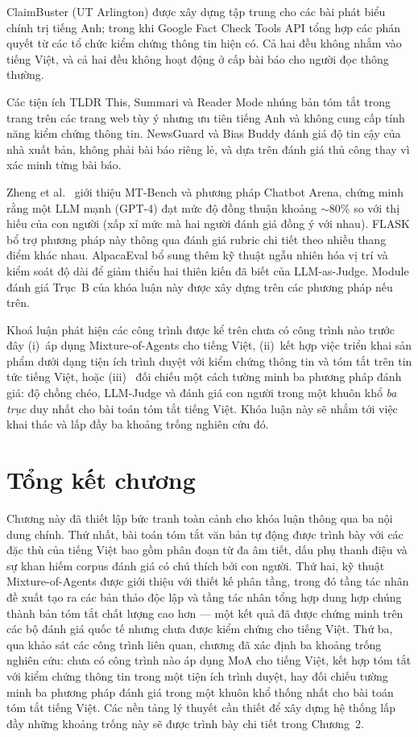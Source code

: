 ClaimBuster (UT Arlington) được xây dựng tập trung cho các bài 
phát biểu chính trị tiếng Anh; trong khi Google Fact
Check Tools API tổng hợp các phán quyết từ các tổ chức kiểm chứng
thông tin hiện có. Cả hai đều không nhắm vào tiếng Việt, và cả hai
đều không hoạt động ở cấp bài báo cho người đọc thông thường.

Các tiện ích TLDR This, Summari và
Reader Mode nhúng bản tóm tắt trong trang trên các trang web
tùy ý nhưng ưu tiên tiếng Anh và không cung cấp tính năng kiểm chứng thông
tin. NewsGuard và Bias Buddy đánh giá độ tin cậy
của nhà xuất bản, không phải bài báo riêng lẻ, và dựa trên
đánh giá thủ công thay vì xác minh từng bài báo.

Zheng et al.\ \cite{Zheng2023} giới thiệu MT-Bench và phương pháp
Chatbot Arena, chứng minh rằng một LLM mạnh (GPT-4) đạt mức độ đồng thuận
khoảng $\sim$80\% so với thị hiếu của con người (xấp xỉ
mức mà hai người đánh giá đồng ý với nhau). FLASK \cite{Ye2023} bổ trợ phương pháp này thông qua đánh giá rubric chi tiết theo nhiều thang điểm khác nhau. AlpacaEval \cite{Dubois2024} bổ sung thêm kỹ thuật ngẫu nhiên hóa vị trí
và kiểm soát độ dài để giảm thiểu hai thiên kiến đã biết của LLM-as-Judge. Module đánh giá Trục~B của khóa luận này được xây dựng trên các
phương pháp nếu trên.

Khoá luận phát hiện các công trình được kể trên chưa có công trình nào trước đây (i)~áp dụng
Mixture-of-Agents cho tiếng Việt, (ii)~kết hợp việc triển khai sản phẩm dưới dạng tiện ích trình duyệt với kiểm chứng thông tin và tóm tắt trên tin tức
tiếng Việt, hoặc (iii)~ đối chiếu một cách tường minh ba phương pháp đánh giá:  độ chồng chéo, LLM-Judge và đánh giá con người trong một khuôn khổ \textit{ba trục} duy nhất
cho bài toán tóm tắt tiếng Việt. Khóa luận này sẽ nhắm tới việc khai thác và lấp đầy 
ba khoảng trống nghiên cứu đó.

\section{Tổng kết chương}

Chương này đã thiết lập bức tranh toàn cảnh cho khóa luận thông qua ba nội dung chính. Thứ nhất, bài toán tóm tắt văn bản tự động được trình bày với các đặc thù của tiếng Việt bao gồm phân đoạn từ đa âm tiết, dấu phụ thanh điệu và sự khan hiếm corpus đánh giá có chú thích bởi con người. Thứ hai, kỹ thuật Mixture-of-Agents được giới thiệu với thiết kế phân tầng, trong đó tầng tác nhân đề xuất tạo ra các bản thảo độc lập và tầng tác nhân tổng hợp dung hợp chúng thành bản tóm tắt chất lượng cao hơn --- một kết quả đã được chứng minh trên các bộ đánh giá quốc tế nhưng chưa được kiểm chứng cho tiếng Việt. Thứ ba, qua khảo sát các công trình liên quan, chương đã xác định ba khoảng trống nghiên cứu: chưa có công trình nào áp dụng MoA cho tiếng Việt, kết hợp tóm tắt với kiểm chứng thông tin trong một tiện ích trình duyệt, hay đối chiếu tường minh ba phương pháp đánh giá trong một khuôn khổ thống nhất cho bài toán tóm tắt tiếng Việt. Các nền tảng lý thuyết cần thiết để xây dựng hệ thống lấp đầy những khoảng trống này sẽ được trình bày chi tiết trong Chương~2.

